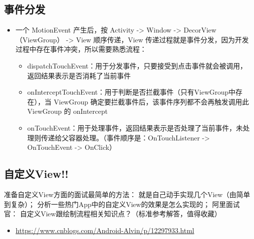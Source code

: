 \documentclass[9pt, b5paper]{article}
\begin{document}
\subsection{事件分发}
\label{sec-2-2}
\begin{itemize}
\item 一个 MotionEvent 产生后，按 Activity -> Window -> DecorView（ViewGroup） -> View 顺序传递，View 传递过程就是事件分发，因为开发过程中存在事件冲突，所以需要熟悉流程：
\begin{itemize}
\item dispatchTouchEvent：用于分发事件，只要接受到点击事件就会被调用，返回结果表示是否消耗了当前事件
\item onInterceptTouchEvent：用于判断是否拦截事件（只有ViewGroup中存在），当 ViewGroup 确定要拦截事件后，该事件序列都不会再触发调用此 ViewGroup 的 onIntercept
\item onTouchEvent：用于处理事件，返回结果表示是否处理了当前事件，未处理则传递给父容器处理。（事件顺序是：OnTouchListener -> OnTouchEvent -> OnClick）
\end{itemize}
\end{itemize}
\subsection{自定义View!!}
\label{sec-2-3}
准备自定义View方面的面试最简单的方法：
就是自己动手实现几个View（由简单到复杂）；
分析一些热门App中的自定义View的效果是怎么实现的；
阿里面试官： 自定义View跟绘制流程相关知识点？（标准参考解答，值得收藏）
\begin{itemize}
\item \url{https://www.cnblogs.com/Android-Alvin/p/12297933.html}
\end{itemize}
\end{document}
